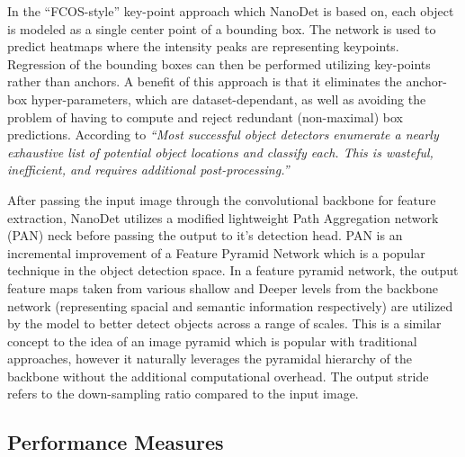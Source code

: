\documentclass[a4paper,twoside,12pt]{report}
\begin{document}
In the ``FCOS-style'' key-point approach which NanoDet is based on, each object is modeled as a single center point of a bounding box. The network is used to predict heatmaps where the intensity peaks are representing keypoints. Regression of the bounding boxes can then be performed utilizing key-points rather than anchors. A benefit of this approach is that it eliminates the anchor-box hyper-parameters, which are dataset-dependant, as well as avoiding the problem of having to compute and reject redundant (non-maximal) box predictions. According to \cite{cnet} \textit{``Most successful object detectors enumerate a nearly exhaustive list of potential object locations and classify each. This is wasteful, inefficient, and requires additional post-processing.''}   

After passing the input image through the convolutional backbone for feature extraction, NanoDet utilizes a modified lightweight Path Aggregation network (PAN) \citep{pan} neck before passing the output to it's detection head. PAN is an incremental improvement of a Feature Pyramid Network \citep{fpn} which is a popular technique in the object detection space. In a feature pyramid network, the output feature maps taken from various shallow and Deeper levels from the backbone network (representing spacial and semantic information respectively) are utilized by the model to better detect objects across a range of scales. This is a similar concept to the idea of an image pyramid which is popular with traditional approaches, however it naturally leverages the pyramidal hierarchy of the backbone without the additional computational overhead. The output stride refers to the down-sampling ratio compared to the input image. 

\subsection{Performance Measures}
\end{document}
